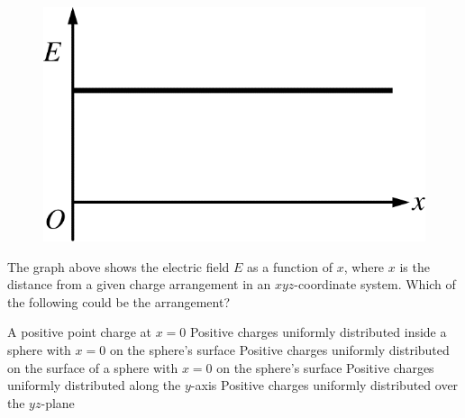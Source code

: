 \begin{figure}[H]
\centering
\includegraphics[scale=0.25]{images/img-009-029.png}
\end{figure}

\begin{questions}\setcounter{question}{15}\question
The graph above shows the electric field $E$ as a function of $x$, where $x$ is the distance from a given charge arrangement in an $x y z$-coordinate system. Which of the following could be the arrangement?

\begin{choices}
\choice A positive point charge at $x=0$
\choice Positive charges uniformly distributed inside a sphere with $x=0$ on the sphere's surface
\choice Positive charges uniformly distributed on the surface of a sphere with $x=0$ on the sphere's surface
\choice Positive charges uniformly distributed along the $y$-axis
\choice Positive charges uniformly distributed over the $y z$-plane
\end{choices}\end{questions}


